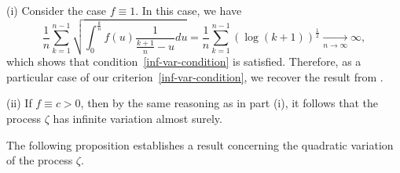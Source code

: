 \documentclass[preprint,12pt,authoryear]{elsarticle}
\begin{document}
\begin{rem}\label{remA}
 (i) Consider the case \( f \equiv 1 \). In this case, we have
\[
\frac{1}{n}\sum_{k=1}^{n-1} \sqrt{\int_0^\frac{k}{n} f(u)\frac{1}{\frac{k+1}{n}-u}du}
= \frac{1}{n}\sum_{k=1}^{n-1}(\log(k+1))^{\frac{1}{2}} \xrightarrow[n \to \infty]{} \infty,
\]
which shows that condition~\eqref{inf-var-condition} is satisfied. Therefore, as a particular case of our criterion~\eqref{inf-var-condition}, we recover the result from \cite{BGT2007}.

(ii) If \( f \equiv c > 0 \), then by the same reasoning as in part (i), it follows that the process \( \zeta \) has infinite variation almost surely.
\end{rem}






The following proposition establishes a result concerning the quadratic variation of the process \( \zeta \).

\end{document}

